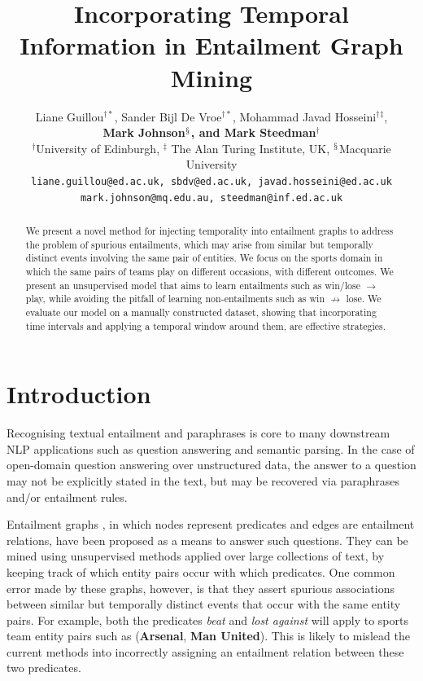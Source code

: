 \documentclass[11pt]{article}
\title{Incorporating Temporal Information in Entailment Graph Mining}
\author{Liane Guillou$^{\dagger*}$, Sander Bijl De Vroe$^{\dagger*}$, Mohammad Javad Hosseini$^{\dagger}$$^{\ddagger}$,\\ \textbf{Mark Johnson$^{\mathsection}$, and Mark Steedman$^{\dagger}$} \\
  $^{\dagger}$University of Edinburgh, $^{\ddagger}$ The Alan Turing Institute, UK, $^{\mathsection}$Macquarie University \\
  {\tt liane.guillou@ed.ac.uk, sbdv@ed.ac.uk, javad.hosseini@ed.ac.uk}\\
 {\tt mark.johnson@mq.edu.au, steedman@inf.ed.ac.uk}}
\date{}
\begin{document}
\maketitle


% 
\begingroup\renewcommand\thefootnote{*}
\endgroup

\begin{abstract}
We present a novel method for injecting temporality into entailment graphs to address the problem of spurious entailments, which may arise from similar but temporally distinct events involving the same pair of entities. We focus on the sports domain in which the same pairs of teams play on different occasions, with different outcomes. We present an unsupervised model that aims to learn entailments such as win/lose $\rightarrow$ play, while avoiding the pitfall of learning non-entailments such as win $\not\rightarrow$ lose. We evaluate our model on a manually constructed dataset, showing that incorporating time intervals and applying a temporal window around them, are effective strategies.
\end{abstract}

\section{Introduction}
\label{sec:introduction}

Recognising textual entailment and paraphrases is core to many downstream NLP applications such as question answering and semantic parsing. In the case of open-domain question answering over unstructured data, the answer to a question may not be explicitly stated in the text, but may be recovered via paraphrases and/or entailment rules.
 
Entailment graphs \cite{berant2011,berant2015,hosseini2018}, in which nodes represent predicates and edges are entailment relations, have been proposed as a means to answer such questions. They can be mined using unsupervised methods applied over large collections of text, by keeping track of which entity pairs occur with which predicates. One common error made by these graphs, however, is that they assert spurious associations between similar but temporally distinct events that occur with the same entity pairs. For example, both the predicates \textit{beat} and \textit{lost against} will apply to sports team entity pairs such as (\textbf{Arsenal}, \textbf{Man United}). This is likely to mislead the current methods into incorrectly assigning an entailment relation between these two predicates.
\end{document}
